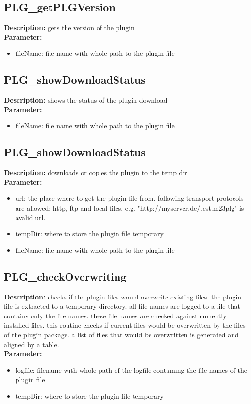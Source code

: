 \subsection{PLG\_getPLGVersion}
\textbf{Description:} gets the version of the plugin\\
\textbf{Parameter:}
\begin{itemize}
\item fileName: file name with whole path to the plugin file
\end{itemize}

\subsection{PLG\_showDownloadStatus}
\textbf{Description:} shows the status of the plugin download\\
\textbf{Parameter:}
\begin{itemize}
\item fileName: file name with whole path to the plugin file
\end{itemize}

\subsection{PLG\_showDownloadStatus}
\textbf{Description:} downloads or copies the plugin to the temp dir\\
\textbf{Parameter:}
\begin{itemize}
\item url: the place where to get the plugin file from. following transport protocols are allowed: http, ftp and local files. e.g. "http://myserver.de/test.m23plg" is avalid url.
\item tempDir: where to store the plugin file temporary
\item fileName: file name with whole path to the plugin file
\end{itemize}

\subsection{PLG\_checkOverwriting}
\textbf{Description:} checks if the plugin files would overwrite existing files. the plugin file is extracted to a temporary directory. all file names are logged to a file that contains only the file names. these file names are checked against currently installed files. this routine checks if current files would be overwritten by the files of the plugin package. a list of files that would be overwritten is generated and aligned by a table.\\
\textbf{Parameter:}
\begin{itemize}
\item logfile: filename with whole path of the logfile containing the file names of the plugin file
\item tempDir: where to store the plugin file temporary
\end{itemize}

